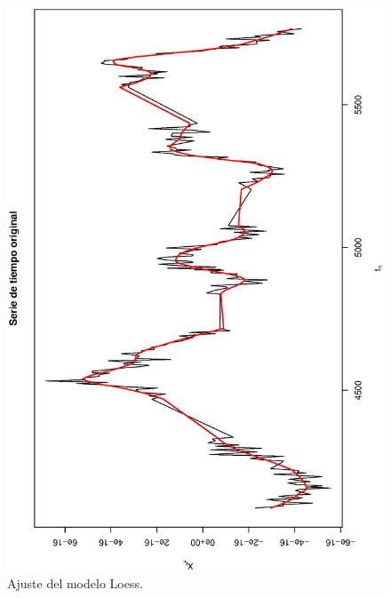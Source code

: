 \begin{figure}[h]
\begin{minipage}{0.45\textwidth}
    \includegraphics[width=0.8\linewidth,angle = 270]{Kap3/Fig_Cap3/agn_loess.eps}
    \caption{Ajuste del modelo Loess.}
    \label{fig:example_agn_loess}
    \end{minipage}


\end{figure}
